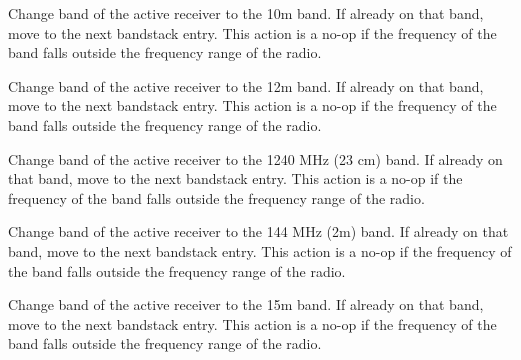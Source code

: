 \documentclass[12pt]{book}
\begin{document}









{Change band of the active receiver to the 10m band. If already on that band, move to
the next bandstack entry. This action is a no-op if the frequency of the band falls outside the frequency
range of the radio.}

{Change band of the active receiver to the 12m band. If already on that band, move to
the next bandstack entry. This action is a no-op if the frequency of the band falls outside the frequency range
of the radio.}

{Change band of the active receiver to the 1240 MHz (23 cm) band. If already on that band, move to
the next bandstack entry. This action is a no-op if the frequency of the band falls outside the frequency
range of the radio.}

{Change band of the active receiver to the 144 MHz (2m) band. If already on that band, move to
the next bandstack entry. This action is a no-op if the frequency of the band falls outside the frequency
range of the radio.}

{Change band of the active receiver to the 15m band. If already on that band, move to
the next bandstack entry. This action is a no-op if the frequency of the band falls outside the frequency
range of the radio.}
\end{document}
